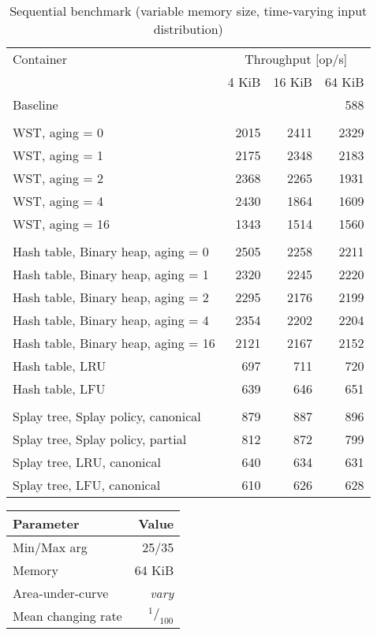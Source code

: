 \begin{table}
\caption{Sequential benchmark (variable memory size, time-varying input distribution)}
\begin{tabular}[]{l  r  r  r } \toprule
Container & \multicolumn{3}{c}{Throughput [op/s]} \\ \cmidrule(r){2-4}
& 4 KiB & 16 KiB & 64 KiB \\ \midrule
Baseline & \multicolumn{3}{r}{588}  \\
\\
WST, aging = 0 & 2015 & 2411 & 2329 \\
WST, aging = 1 & 2175 & 2348 & 2183 \\
WST, aging = 2 & 2368 & 2265 & 1931 \\
WST, aging = 4 & 2430 & 1864 & 1609 \\
WST, aging = 16 & 1343 & 1514 & 1560 \\
\\
Hash table, Binary heap, aging = 0 & 2505 & 2258 & 2211 \\
Hash table, Binary heap, aging = 1 & 2320 & 2245 & 2220 \\
Hash table, Binary heap, aging = 2 & 2295 & 2176 & 2199 \\
Hash table, Binary heap, aging = 4 & 2354 & 2202 & 2204 \\
Hash table, Binary heap, aging = 16 & 2121 & 2167 & 2152 \\
Hash table, LRU & 697 & 711 & 720 \\
Hash table, LFU & 639 & 646 & 651 \\
\\
Splay tree, Splay policy, canonical & 879 & 887 & 896 \\
Splay tree, Splay policy, partial & 812 & 872 & 799 \\
Splay tree, LRU, canonical & 640 & 634 & 631 \\
Splay tree, LFU, canonical & 610 & 626 & 628 \\
\bottomrule
\end{tabular}
\end{table}

\pagebreak

\begin{tabular}[h]{l r} \toprule
Parameter & Value \\ \midrule
Min/Max arg & 25/35 \\
Memory & 64 KiB \\
Area-under-curve & \emph{vary} \\
Mean changing rate & $^1/_{100}$ \\ \bottomrule
\end{tabular}

